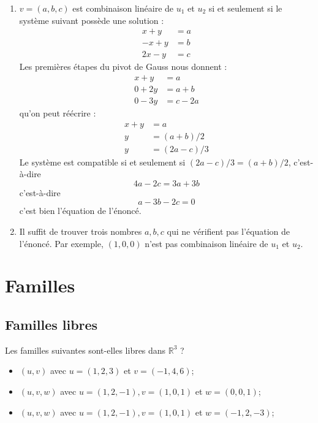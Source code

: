 {\begin{mdframed}
\begin{enumerate}
      \item $v=(a, b, c)$ est combinaison linéaire de $u_1$ et $u_2$ si et seulement si le système suivant possède une solution : 
      \begin{align*}
        x + y &= a \\
        -x + y &= b \\
        2x - y &= c
      \end{align*}
      Les premières étapes du pivot de Gauss nous donnent : 
      \begin{align*}
        x + y &= a \\
        0 + 2y &= a + b \\
        0 - 3y &= c- 2a
      \end{align*}
      qu'on peut réécrire : 
      \begin{align*}
        x + y &= a \\
        y &= (a + b)/2 \\
        y &= (2a-c)/3
      \end{align*}
      Le système est compatible si et seulement si $(2a-c)/3 = (a+b)/2$, c'est-à-dire
      $$
      4a - 2c = 3a + 3b
      $$
      c'est-à-dire
      $$
      a - 3b - 2c = 0
      $$
      c'est bien l'équation de l'énoncé.

      \item Il suffit de trouver trois nombres $a, b, c$ qui ne vérifient pas l'équation de l'énoncé. Par exemple, $(1,0,0)$ n'est pas combinaison linéaire de $u_1$ et $u_2$.
    \end{enumerate}
  \end{mdframed}
}{}



\section*{Familles}
\vspace{1em}
\subsection{Familles libres}

Les familles suivantes sont-elles libres dans $\mathbb{R}^3$ ?
\begin{itemize}
    \item $(u, v)$ avec $u=(1,2,3)$ et $v=(-1,4,6)$;
    \item $(u, v, w)$ avec $u=(1,2,-1), v=(1,0,1)$ et $w=(0,0,1)$;
    \item $(u, v, w)$ avec $u=(1,2,-1), v=(1,0,1)$ et $w=(-1,2,-3)$;
\end{itemize}


